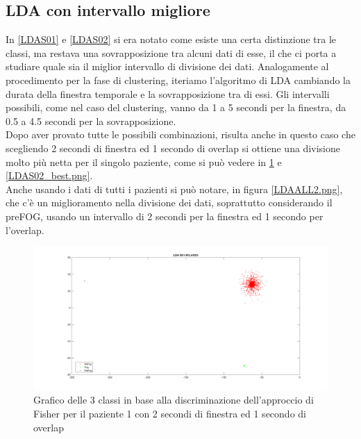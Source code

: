 \subsection{LDA con intervallo migliore}
In \ref{LDAS01} e \ref{LDAS02} si era notato come esiste una certa distinzione tra le classi, ma restava una sovrapposizione tra alcuni dati di esse, il che ci porta a studiare quale sia il miglior intervallo di divisione dei dati. Analogamente al procedimento per la fase di clustering, iteriamo l'algoritmo di LDA cambiando la durata della finestra temporale e la sovrapposizione tra di essi. Gli intervalli possibili, come nel caso del clustering, vanno da 1 a 5 secondi per la finestra, da 0.5 a 4.5 secondi per la sovrapposizione.\\
Dopo aver provato tutte le possibili combinazioni, risulta anche in questo caso che scegliendo 2 secondi di finestra ed 1 secondo di overlap si ottiene una divisione molto più netta per il singolo paziente, come si può vedere in \ref{LDAS01_best.png} e \ref{LDAS02_best.png}.\\
Anche usando i dati di tutti i pazienti si può notare, in figura \ref{LDAALL2.png}, che c'è un miglioramento nella divisione dei dati, soprattutto considerando il preFOG, usando un intervallo di 2 secondi per la finestra ed 1 secondo per l'overlap.
\begin{figure}[]
	\centering
	\includegraphics[scale=0.25]{images/LDAS01_best.png}
	\caption{Grafico delle 3 classi in base alla discriminazione dell'approccio di Fisher per il paziente 1 con 2 secondi di finestra ed 1 secondo di overlap}
	\label{LDAS01_best.png}
\end{figure}
